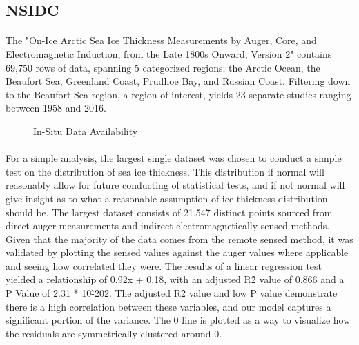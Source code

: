 \subsection*{NSIDC}
\paragraph*{}
The "On-Ice Arctic Sea Ice Thickness Measurements by Auger, Core, and Electromagnetic Induction, from the Late 1800s Onward, Version 2" contains 69,750 rows of data, spanning 5 categorized regions; the Arctic Ocean, the Beaufort Sea, Greenland Coast, Prudhoe Bay, and Russian Coast. Filtering down to the Beaufort Sea region, a region of interest, yields 23 separate studies ranging between 1958 and 2016.
\par
\begin{figure}[htb]
	\centering
	\caption{In-Situ Data Availability}
	\label{fig:foobar}
\end{figure}


\paragraph*{}
For a simple analysis, the largest single dataset was chosen to conduct a simple test on the distribution of sea ice thickness. This distribution if normal will reasonably allow for future conducting of statistical tests, and if not normal will give insight as to what a reasonable assumption of ice thickness distribution should be. The largest dataset consists of 21,547 distinct points sourced from direct auger measurements and indirect electromagnetically sensed methods. Given that the majority of the data comes from the remote sensed method, it was validated by plotting the sensed values against the auger values where applicable and seeing how correlated they were. The results of a linear regression test yielded a relationship of 0.92x + 0.18, with an adjusted R\^2 value of 0.866 and a P Value of 2.31 * 10\^-202. The adjusted R\^2 value and low P value demonstrate there is a high correlation between these variables, and our model captures a significant portion of the variance. The 0 line is plotted as a way to visualize how the residuals are symmetrically clustered around 0.
\par

